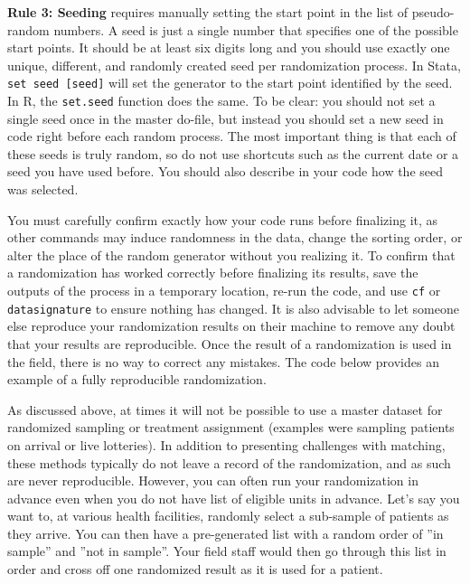 \textbf{Rule 3: Seeding} requires manually setting the start point in the list of pseudo-random numbers.
A seed is just a single number that specifies one of the possible start points.
It should be at least six digits long and you should use exactly
one unique, different, and randomly created seed per randomization process.
In Stata, \texttt{set seed [seed]} will set the generator
to the start point identified by the seed.
In R, the \texttt{set.seed} function does the same.
To be clear: you should not set a single seed once in the master do-file,
but instead you should set a new seed in code right before each random process.
The most important thing is that each of these seeds is truly random,
so do not use shortcuts such as the current date or a seed you have used before.
You should also describe in your code how the seed was selected.

You must carefully confirm exactly how your code runs before finalizing it,
as other commands may induce randomness in the data,
change the sorting order,
or alter the place of the random generator without you realizing it.
To confirm that a randomization has worked correctly before finalizing its results,
save the outputs of the process in a temporary location,
re-run the code, and use \texttt{cf} or \texttt{datasignature} to ensure
nothing has changed. It is also advisable to let someone else reproduce your
randomization results on their machine to remove any doubt that your results
are reproducible.
Once the result of a randomization is used in the field,
there is no way to correct any mistakes.
The code below provides an example of a fully reproducible randomization. 


As discussed above, at times it will not be possible to use a master dataset for 
randomized sampling or treatment assignment
(examples were sampling patients on arrival or live lotteries).
In addition to presenting challenges with matching,
these methods typically do not leave a record of the randomization,
and as such are never reproducible.
However, you can often run your randomization in advance
even when you do not have list of eligible units in advance.
Let's say you want to, at various health facilities,
randomly select a sub-sample of patients as they arrive.
You can then have a pre-generated list
with a random order of ''in sample'' and ''not in sample''.
Your field staff would then go through this list in order
and cross off one randomized result as it is used for a patient.

